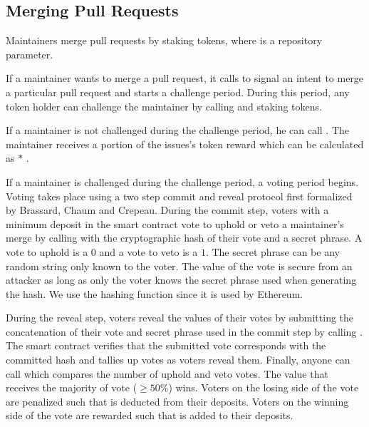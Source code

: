 \subsection{Merging Pull Requests}
\label{sec:merge}

Maintainers merge pull requests by staking  tokens,
where  is a repository parameter.

If a maintainer wants to merge a pull request, it calls
 to signal an intent to merge a particular pull
request and starts a challenge period. During this period, any token holder can
challenge the maintainer by calling  and staking
 tokens.

If a maintainer is not challenged during the challenge period, he can call
. The maintainer receives a portion of the
issues's token reward which can be calculated as  $*$ .

If a maintainer is challenged during the challenge period, a voting
period begins. Voting takes place using a two step commit and reveal protocol
first formalized by Brassard, Chaum and Crepeau\cite{proofsofknowledge}. During
the commit step, voters with a minimum  deposit in the
smart contract vote to uphold or veto a maintainer's merge by calling
 with the cryptographic hash of their vote and a secret
phrase. A vote to uphold is a $0$ and a vote to veto is a $1$. The secret phrase
can be any random string only known to the voter. The value of the vote is
secure from an attacker as long as only the voter knows the secret phrase used
when generating the hash. We use the  hashing function since it is used by Ethereum.

During the reveal step, voters reveal the values of their votes by submitting
the concatenation of their vote and secret phrase used in the commit step by
calling . The smart contract verifies that the
submitted vote corresponds with the committed hash and tallies up votes as
voters reveal them. Finally, anyone can call  which
compares the number of uphold and veto votes. The value that receives the
majority of vote ($\geq 50\%$) wins. Voters on the losing side of the vote are
penalized such that  is deducted from their
deposits. Voters on the winning side of the vote are rewarded such that
 is added to their deposits.

